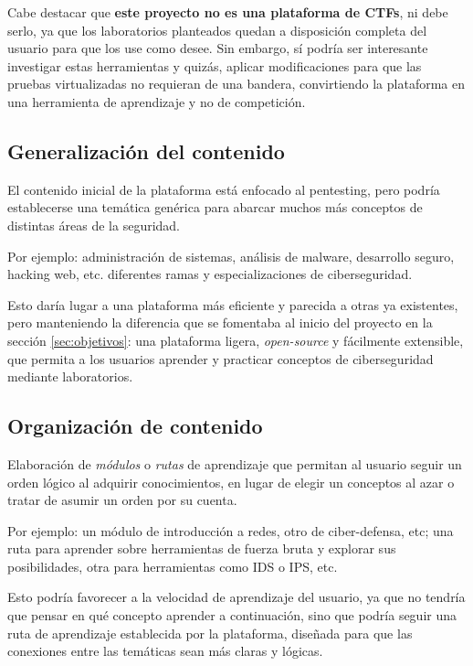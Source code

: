                 Cabe destacar que \textbf{este proyecto no es una plataforma de CTFs}, ni debe serlo, ya que los laboratorios planteados quedan a disposición completa del usuario para que los use como desee. Sin embargo, sí podría ser interesante investigar estas herramientas y quizás, aplicar modificaciones para que las pruebas virtualizadas no requieran de una bandera, convirtiendo la plataforma en una herramienta de aprendizaje y no de competición.
            
        \subsection{Generalización del contenido}
            
            El contenido inicial de la plataforma está enfocado al pentesting, pero podría establecerse una temática genérica para abarcar muchos más conceptos de distintas áreas de la seguridad.
            
            Por ejemplo: administración de sistemas, análisis de malware, desarrollo seguro, hacking web, etc. diferentes ramas y especializaciones de ciberseguridad.
            
            Esto daría lugar a una plataforma más eficiente y parecida a otras ya existentes, pero manteniendo la diferencia que se fomentaba al inicio del proyecto en la sección \ref{sec:objetivos}: una plataforma ligera, \textit{open-source} y fácilmente extensible, que permita a los usuarios aprender y practicar conceptos de ciberseguridad mediante laboratorios.

        \subsection{Organización de contenido}
        
            Elaboración de \textit{módulos} o \textit{rutas} de aprendizaje que permitan al usuario seguir un orden lógico al adquirir conocimientos, en lugar de elegir un conceptos al azar o tratar de asumir un orden por su cuenta.

            Por ejemplo: un módulo de introducción a redes, otro de ciber-defensa, etc; una ruta para aprender sobre herramientas de fuerza bruta y explorar sus posibilidades, otra para herramientas como IDS o IPS, etc.

            Esto podría favorecer a la velocidad de aprendizaje del usuario, ya que no tendría que pensar en qué concepto aprender a continuación, sino que podría seguir una ruta de aprendizaje establecida por la plataforma, diseñada para que las conexiones entre las temáticas sean más claras y lógicas.

            \cleardoublepage

